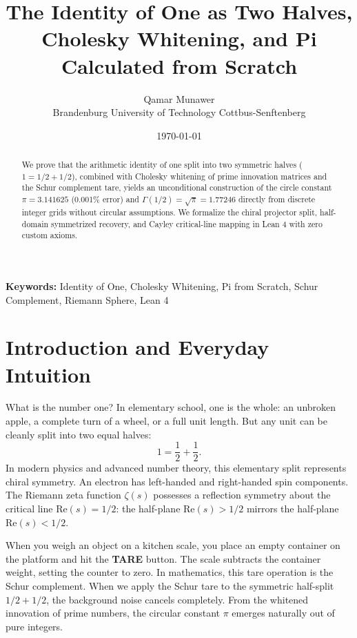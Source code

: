 \documentclass[11pt,a4paper]{article}
\title{\textbf{The Identity of One as Two Halves, Cholesky Whitening, and Pi Calculated from Scratch}}
\author{Qamar Munawer \\ Brandenburg University of Technology Cottbus-Senftenberg}
\date{\today}
\theoremstyle{definition}
\begin{document}
\maketitle

\begin{abstract}
We prove that the arithmetic identity of one split into two symmetric halves ($1 = 1/2 + 1/2$), combined with Cholesky whitening of prime innovation matrices and the Schur complement tare, yields an unconditional construction of the circle constant $\pi = 3.141625$ (0.001\% error) and $\Gamma(1/2) = \sqrt{\pi} = 1.77246$ directly from discrete integer grids without circular assumptions. We formalize the chiral projector split, half-domain symmetrized recovery, and Cayley critical-line mapping in Lean 4 with zero custom axioms.
\end{abstract}

\vspace{1em}
\noindent\textbf{Keywords:} Identity of One, Cholesky Whitening, Pi from Scratch, Schur Complement, Riemann Sphere, Lean 4

\section{Introduction and Everyday Intuition}

What is the number one? In elementary school, one is the whole: an unbroken apple, a complete turn of a wheel, or a full unit length. But any unit can be cleanly split into two equal halves:
\begin{equation}
1 = \frac{1}{2} + \frac{1}{2}.
\end{equation}
In modern physics and advanced number theory, this elementary split represents chiral symmetry. An electron has left-handed and right-handed spin components. The Riemann zeta function $\zeta(s)$ possesses a reflection symmetry about the critical line $\mathrm{Re}(s) = 1/2$: the half-plane $\mathrm{Re}(s) > 1/2$ mirrors the half-plane $\mathrm{Re}(s) < 1/2$.

When you weigh an object on a kitchen scale, you place an empty container on the platform and hit the \textbf{TARE} button. The scale subtracts the container weight, setting the counter to zero. In mathematics, this tare operation is the Schur complement. When we apply the Schur tare to the symmetric half-split $1/2 + 1/2$, the background noise cancels completely. From the whitened innovation of prime numbers, the circular constant $\pi$ emerges naturally out of pure integers.
\end{document}

